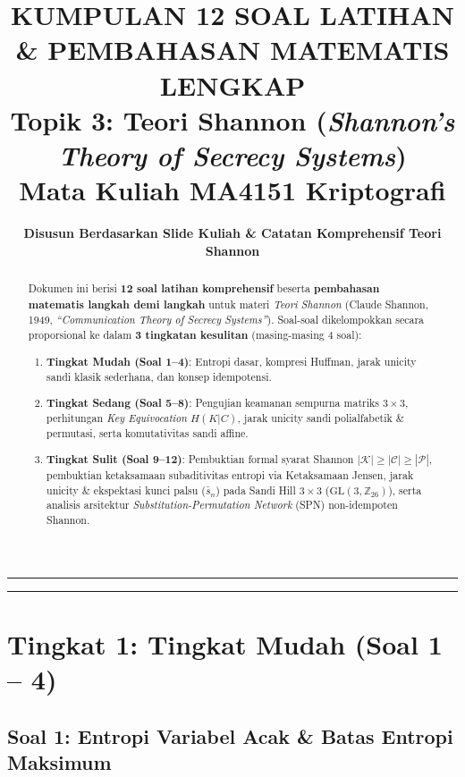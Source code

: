 \documentclass[11pt,a4paper]{article}
\title{\vspace{-1cm}\textbf{\Large KUMPULAN 12 SOAL LATIHAN \& PEMBAHASAN MATEMATIS LENGKAP}\\\large Topik 3: Teori Shannon (\textit{Shannon's Theory of Secrecy Systems})\\\large\textbf{Mata Kuliah MA4151 Kriptografi}}
\author{\textbf{Disusun Berdasarkan Slide Kuliah \& Catatan Komprehensif Teori Shannon}}
\date{}
\begin{document}
\maketitle
\vspace{-0.5cm}

\begin{abstract}
Dokumen ini berisi \textbf{12 soal latihan komprehensif} beserta \textbf{pembahasan matematis langkah demi langkah} untuk materi \textit{Teori Shannon} (Claude Shannon, 1949, \textit{``Communication Theory of Secrecy Systems''}). Soal-soal dikelompokkan secara proporsional ke dalam \textbf{3 tingkatan kesulitan} (masing-masing 4 soal):
\begin{enumerate}[leftmargin=*]
    \item \textbf{Tingkat Mudah (Soal 1--4)}: Entropi dasar, kompresi Huffman, jarak unicity sandi klasik sederhana, dan konsep idempotensi.
    \item \textbf{Tingkat Sedang (Soal 5--8)}: Pengujian keamanan sempurna matriks $3 \times 3$, perhitungan \textit{Key Equivocation} $H(K|C)$, jarak unicity sandi polialfabetik \& permutasi, serta komutativitas sandi affine.
    \item \textbf{Tingkat Sulit (Soal 9--12)}: Pembuktian formal syarat Shannon $|\mathcal{K}| \ge |\mathcal{C}| \ge |\mathcal{P}|$, pembuktian ketaksamaan subaditivitas entropi via Ketaksamaan Jensen, jarak unicity \& ekspektasi kunci palsu ($\bar{s}_n$) pada Sandi Hill $3 \times 3$ ($\mathrm{GL}(3, \mathbb{Z}_{26})$), serta analisis arsitektur \textit{Substitution-Permutation Network} (SPN) non-idempoten Shannon.
\end{enumerate}
\end{abstract}

\vspace{0.2cm}
\hrule
\vspace{0.3cm}

\tableofcontents

\vspace{0.4cm}
\hrule
\vspace{0.6cm}

\section{Tingkat 1: Tingkat Mudah (Soal 1 -- 4)}

\subsection{Soal 1: Entropi Variabel Acak \& Batas Entropi Maksimum}
\end{document}
